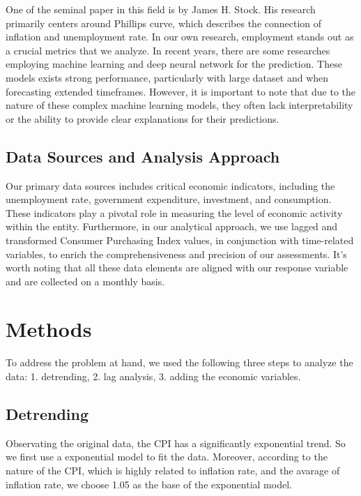 \documentclass[
  man,floatsintext,
  man]{apa6}
\begin{document}
One of the seminal paper in this field is by James H. Stock\autocite{STOCK1999293}. His research primarily centers around Phillips curve, which describes the connection of inflation and unemployment rate. In our own research, employment stands out as a crucial metrics that we analyze.
In recent years, there are some researches \autocite{NGUYEN2023e20730} \autocite{BARKAN20231145} employing machine learning and deep neural network for the prediction. These models exists strong performance, particularly with large dataset and when forecasting extended timeframes. However, it is important to note that due to the nature of these complex machine learning models, they often lack interpretability or the ability to provide clear explanations for their predictions.

\hypertarget{data-sources-and-analysis-approach}{%
\subsection{Data Sources and Analysis Approach}\label{data-sources-and-analysis-approach}}

Our primary data sources includes critical economic indicators, including the unemployment rate, government expenditure, investment, and consumption. These indicators play a pivotal role in measuring the level of economic activity within the entity. Furthermore, in our analytical approach, we use lagged and transformed Consumer Purchasing Index values, in conjunction with time-related variables, to enrich the comprehensiveness and precision of our assessments. It's worth noting that all these data elements are aligned with our response variable and are collected on a monthly basis.

\hypertarget{methods}{%
\section{Methods}\label{methods}}

To address the problem at hand, we used the following three steps to analyze the data: 1. detrending, 2. lag analysis, 3. adding the economic variables.

\hypertarget{detrending}{%
\subsection{Detrending}\label{detrending}}

Observating the original data, the CPI has a significantly exponential trend. So we first use a exponential model to fit the data.
Moreover, according to the nature of the CPI, which is highly related to inflation rate, and the avarage of inflation rate, we choose 1.05 as the base of the exponential model.
\end{document}
